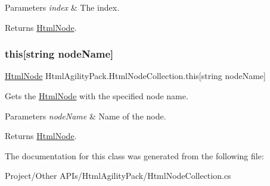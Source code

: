 \begin{DoxyParams}{Parameters}
{\em index} & The index.\\
\hline
\end{DoxyParams}
\begin{DoxyReturn}{Returns}
\hyperlink{class_html_agility_pack_1_1_html_node}{Html\+Node}.
\end{DoxyReturn}
\mbox{\label{class_html_agility_pack_1_1_html_node_collection_a768bfd4cb14d7e0a84b0b85baa3687fb}} 
\subsubsection{\texorpdfstring{this[string node\+Name]}{this[string nodeName]}}
{\footnotesize\ttfamily \hyperlink{class_html_agility_pack_1_1_html_node}{Html\+Node} Html\+Agility\+Pack.\+Html\+Node\+Collection.\+this\mbox{[}string node\+Name\mbox{]}\hspace{0.3cm}{\ttfamily [get]}}



Gets the \hyperlink{class_html_agility_pack_1_1_html_node}{Html\+Node} with the specified node name. 


\begin{DoxyParams}{Parameters}
{\em node\+Name} & Name of the node.\\
\hline
\end{DoxyParams}
\begin{DoxyReturn}{Returns}
\hyperlink{class_html_agility_pack_1_1_html_node}{Html\+Node}.
\end{DoxyReturn}


The documentation for this class was generated from the following file\+:\begin{DoxyCompactItemize}
\item 
Project/\+Other A\+P\+Is/\+Html\+Agility\+Pack/Html\+Node\+Collection.\+cs\end{DoxyCompactItemize}
